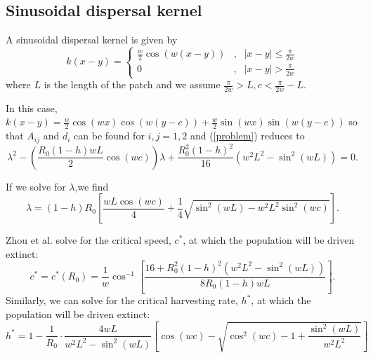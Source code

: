 \documentclass[12pt,english]{article}
\begin{document}
\subsection{Sinusoidal dispersal kernel \label{sinapp}}
A sinusoidal dispersal kernel is given by 
$$k(x-y)=\left\{\begin{array}{ccccc}
\frac{w}{2}\cos(w(x-y)) & , & |x-y|\leq\frac{\pi}{2w}
\\ 0 & , & |x-y|>\frac{\pi}{2w}
\end{array}\right.
$$
where $L$ is the length of the patch and we assume $\frac{\pi}{2w}>L,c<\frac{\pi}{2w}-L$.

In this case, $k(x-y)=\frac{w}{2}\cos(wx)\cos(w(y-c))+\frac{w}{2}\sin(wx)\sin(w(y-c))$ so that $A_{ij}$ and $d_i$ can be found for $i,j=1,2$ and (\ref{problem}) reduces to 
$$\lambda^2-\left(\frac{R_0(1-h)wL}{2}\cos(wc)\right)\lambda+\frac{R_0^2(1-h)^2}{16}\left(w^2L^2-\sin^2(wL)\right)=0.$$

If we solve for $\lambda$,we find
\begin{equation*} \lambda=(1-h)R_0\left[\frac{wL\cos(wc)}{4}+\frac{1}{4}\sqrt{\sin^2(wL)-w^2L^2\sin^2(wc)}\right]. \label{cosine} \end{equation*}


Zhou et al. \citep{ZhouKot2011} solve for the critical speed, $c^*$, at which the population will be driven extinct:
$$c^*=c^*(R_0)=\frac{1}{w}\cos^{-1}\left[\frac{16+R_0^2(1-h)^2(w^2L^2-\sin^2(wL))}{8R_0(1-h)wL}\right].$$
Similarly, we can solve for the critical harvesting rate, $h^*$, at which the population will be driven extinct:
$$
h^*=1-\frac{1}{R_0}\cdot\frac{4wL}{w^2L^2-\sin^2(wL)}\left[\cos(wc)-\sqrt{\cos^2(wc)-1+\frac{\sin^2(wL)}{w^2L^2}}\right] 
$$
\end{document}
